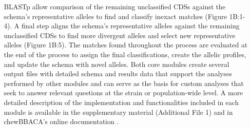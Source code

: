 BLASTp allow comparison of the remaining unclassified CDSs against the schema's representative alleles to find and classify inexact matches (Figure 1B:1-4). A final step aligns the schema's representative alleles against the remaining unclassified CDSs to find more divergent alleles and select new representative alleles (Figure 1B:5). The matches found throughout the process are evaluated at the end of the process to assign the final classifications, create the allelic profiles, and update the schema with novel alleles. Both core modules create several output files with detailed schema and results data that support the analyses performed by other modules and can serve as the basis for custom analyses that seek to answer relevant questions at the strain or population-wide level.
A more detailed description of the implementation and functionalities included in each module is available in the supplementary material (Additional File 1) and in chewBBACA’s online documentation \citep{noauthor_chewbbaca_nodate}.

